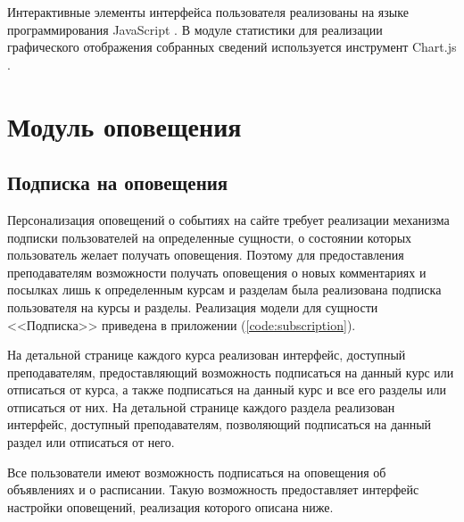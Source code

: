 \documentclass[12pt, a4paper, oneside]{article}
\begin{document}
Интерактивные элементы интерфейса пользователя реализованы на языке программирования JavaScript \cite{js}. В модуле статистики для реализации графического отображения собранных сведений используется инструмент Chart.js \cite{chartjs}.
\newpage

\section{Модуль оповещения}
\subsection{Подписка на оповещения}
Персонализация оповещений о событиях на сайте требует реализации механизма подписки пользователей на определенные сущности, о состоянии которых пользователь желает получать оповещения. Поэтому для предоставления преподавателям возможности получать оповещения о новых комментариях и посылках лишь к определенным курсам и разделам была реализована подписка пользователя на курсы и разделы. Реализация модели для сущности <<Подписка>> приведена в приложении (\ref{code:subscription}).

На детальной странице каждого курса реализован интерфейс, доступный преподавателям, предоставляющий возможность подписаться на данный курс или отписаться от курса, а также подписаться на данный курс и все его разделы или отписаться от них. На детальной странице каждого раздела реализован интерфейс, доступный преподавателям, позволяющий подписаться на данный раздел или отписаться от него.

Все пользователи имеют возможность подписаться на оповещения об объявлениях и о расписании. Такую возможность предоставляет интерфейс настройки оповещений, реализация которого описана ниже.
\end{document}
